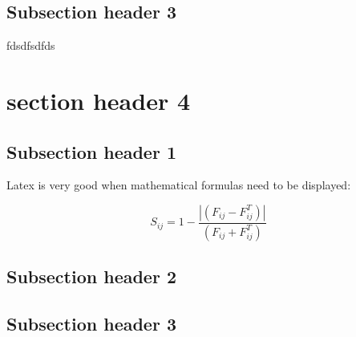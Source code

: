 \subsection{Subsection header 3}
fdsdfsdfds

\section{section header 4}

\subsection{Subsection header 1}

Latex is very good when mathematical formulas need to be displayed:

\begin{equation}\label{taeq2}
    S_{ij}=1-{\frac{|(F_{ij}-F^T_{ij})|}{(F_{ij}+F^T_{ij})}}
\end{equation}

\subsection{Subsection header 2}
\subsection{Subsection header 3}
